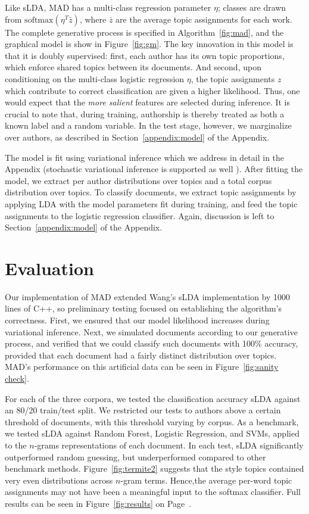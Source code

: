 \documentclass[14pt]{article} %
\theoremstyle{plain}
\theoremstyle{definition}
\theoremstyle{remark}
\begin{document}
Like sLDA, MAD has a multi-class regression parameter $\eta$; classes are drawn from $\text{softmax}(\eta^T\bar{z})$, where $\overline{z}$ are the average topic assignments for each work. The complete generative process is specified in Algorithm~\ref{fig:mad}, and the graphical model is show in Figure~\ref{fig:gm}. The key innovation in this model is that it is doubly supervised: first, each author has its own topic proportions, which enforce shared topics between its documents. And second, upon conditioning on the multi-class logistic regression $\eta$, the topic assignments $z$ which contribute to correct classification are given a higher likelihood.  Thus, one would expect that the \emph{more salient} features are selected during inference. It is crucial to note that, during training, authorship is thereby treated as both a known label and a random variable. In the test stage, however, we marginalize over authors, as described in Section~\ref{appendix:model} of the Appendix.

The model is fit using variational inference \cite{wainwright2008graphical} which we address in detail in the Appendix (stochastic variational inference is supported as well \cite{hoffman2013stochastic}). After fitting the model, we extract per author distributions over topics and a total corpus distribution over topics. To classify documents, we extract topic assignments by applying LDA with the model parameters fit during training, and feed the topic assignments to the logistic regression classifier. Again, discussion is left to Section~\ref{appendix:model} of the Appendix. 

\section{Evaluation}

Our implementation of MAD extended Wang's sLDA implementation by 1000 lines of C++, so preliminary testing focused on establishing the algorithm's correctness. First, we ensured that our model likelihood increases during variational inference. Next, we simulated documents according to our generative process, and verified that we could classify such documents with 100\% accuracy, provided that each document had a fairly distinct distribution over topics. MAD's performance on this artificial data can be seen in Figure~\ref{fig:sanity check}. 

For each of the three corpora, we tested the classification accuracy sLDA against an 80/20 train/test split. We restricted our tests to authors above a certain threshold of documents, with this threshold varying by corpus. As a benchmark, we tested sLDA against Random Forest, Logistic Regression, and SVMs, applied to the $n$-grams representations of each document. In each test, sLDA significantly outperformed random guessing, but underperformed compared to other benchmark methods. Figure~\ref{fig:termite2} suggests that the style topics contained very even distributions across $n$-gram terms. Hence,the average per-word topic assignments may not have been a meaningful input to the softmax classifier. Full results can be seen in Figure~\ref{fig:results} on Page~\pageref{fig:results}.
\end{document}
